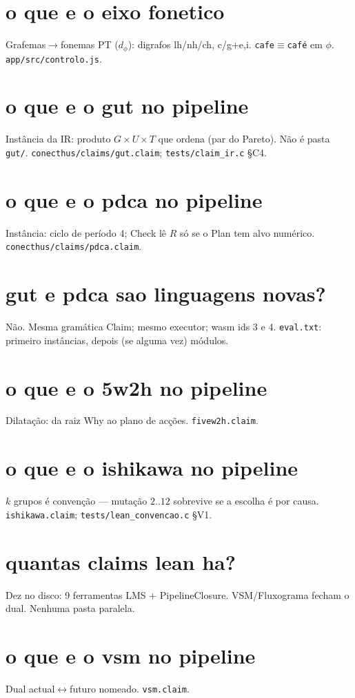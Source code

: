 \documentclass[11pt,a4paper]{article}
\newcommand{\code}[1]{\texttt{\small #1}}
\begin{document}
\section{o que e o eixo fonetico}
Grafemas$\to$fonemas PT ($d_{\phi}$): digrafos lh/nh/ch, c/g+e,i.
\texttt{cafe}$\equiv$\texttt{café} em $\phi$. \code{app/src/controlo.js}.

\section{o que e o gut no pipeline}
Instância da IR: produto $G\times U\times T$ que ordena (par do Pareto).
Não é pasta \code{gut/}. \code{conecthus/claims/gut.claim}; \code{tests/claim\_ir.c} \S C4.

\section{o que e o pdca no pipeline}
Instância: ciclo de período 4; Check lê $R$ só se o Plan tem alvo numérico.
\code{conecthus/claims/pdca.claim}.

\section{gut e pdca sao linguagens novas?}
Não. Mesma gramática Claim; mesmo executor; wasm ids 3 e 4.
\code{eval.txt}: primeiro instâncias, depois (se alguma vez) módulos.

\section{o que e o 5w2h no pipeline}
Dilatação: da raiz Why ao plano de acções. \code{fivew2h.claim}.

\section{o que e o ishikawa no pipeline}
$k$ grupos é convenção --- mutação $2..12$ sobrevive se a escolha é por causa.
\code{ishikawa.claim}; \code{tests/lean\_convencao.c} \S V1.

\section{quantas claims lean ha?}
Dez no disco: 9 ferramentas LMS + PipelineClosure.
VSM/Fluxograma fecham o dual. Nenhuma pasta paralela.

\section{o que e o vsm no pipeline}
Dual actual$\leftrightarrow$futuro nomeado. \code{vsm.claim}.
\end{document}
